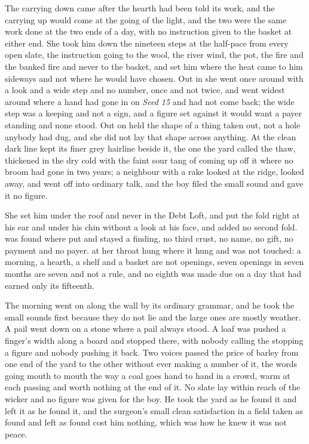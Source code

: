 The carrying down came after the hearth had been told its work, and the carrying up would come at the going of the light, and the two were the same work done at the two ends of a day, with no instruction given to the basket at either end. She took him down the nineteen steps at the half-pace from every open slate, the instruction going to the wool, the river wind, the pot, the fire and the banked fire and never to the basket, and set him where the heat came to him sideways and not where he would have chosen. Out in  she went once around  with a look and a wide step and no number, once and not twice, and went widest around  where a hand had gone in on \emph{Seed 15} and had not come back; the wide step was a keeping and not a sign, and a figure set against it would want a payer standing and none stood. Out on   held the shape of a thing taken out, not a hole anybody had dug, and she did not lay that shape across anything. At  the clean dark line kept its finer grey hairline beside it, the one the yard called the thaw, thickened in the dry cold with the faint sour tang of  coming up off it where no broom had gone in two years; a neighbour with a rake looked at the ridge, looked away, and went off into ordinary talk, and the boy filed the small sound and gave it no figure.

She set him under the roof and never in the Debt Loft, and put the fold right at his ear and under his chin without a look at his face, and added no second fold.  was found where put and stayed a finding, no third crust, no name, no gift, no payment and no payer.  at her throat hung where it hung and was not touched: a morning, a hearth, a shelf and a basket are not openings, seven openings in seven months are seven and not a rule, and no eighth was made due on a day that had earned only its fifteenth.

The morning went on along the wall by its ordinary grammar, and he took the small sounds first because they do not lie and the large ones are mostly weather. A pail went down on a stone where a pail always stood. A loaf was pushed a finger's width along a board and stopped there, with nobody calling the stopping a figure and nobody pushing it back. Two voices passed the price of barley from one end of the yard to the other without ever making a number of it, the words going mouth to mouth the way a coal goes hand to hand in a crowd, warm at each passing and worth nothing at the end of it. No slate lay within reach of the wicker and no figure was given for the boy. He took the yard as he found it and left it as he found it, and the surgeon's small clean satisfaction in a field taken as found and left as found cost him nothing, which was how he knew it was not peace.

